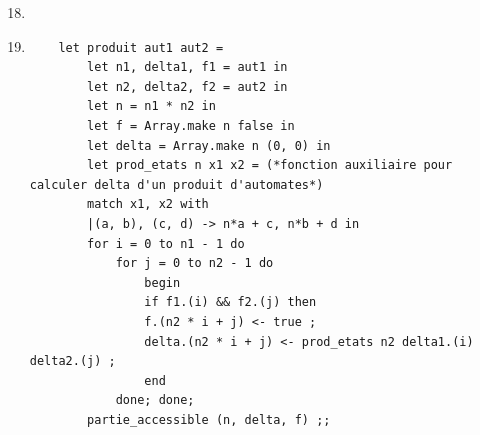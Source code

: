 \documentclass{article}
\begin{document}
\begin{enumerate}
    \setcounter{enumi}{17}

    \item  \begin{minipage}[t]{\linewidth}
        \centering
        \label{fig:fig1}
        \end{minipage}

    \item \begin{verbatim}
    let produit aut1 aut2 = 
        let n1, delta1, f1 = aut1 in 
        let n2, delta2, f2 = aut2 in 
        let n = n1 * n2 in 
        let f = Array.make n false in
        let delta = Array.make n (0, 0) in
        let prod_etats n x1 x2 = (*fonction auxiliaire pour calculer delta d'un produit d'automates*)
        match x1, x2 with
        |(a, b), (c, d) -> n*a + c, n*b + d in
        for i = 0 to n1 - 1 do
            for j = 0 to n2 - 1 do
                begin
                if f1.(i) && f2.(j) then
                f.(n2 * i + j) <- true ;
                delta.(n2 * i + j) <- prod_etats n2 delta1.(i) delta2.(j) ;
                end
            done; done;
        partie_accessible (n, delta, f) ;;
    \end{verbatim}


\end{enumerate}
\end{document}
